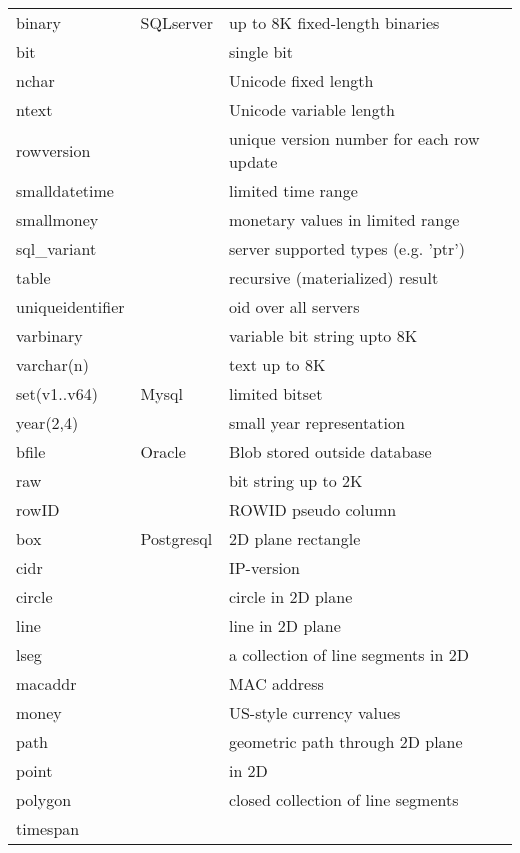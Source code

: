 \documentclass[10pt,twocolumn,fleqn]{article}
\begin{document}
\begin{tabular}{l |l |l}
binary & SQLserver & up to 8K fixed-length binaries\\
bit	&  & single bit\\
nchar	&  & Unicode fixed length\\
ntext	&  & Unicode variable length\\
rowversion&  & unique version number for each row update\\
smalldatetime&  & limited time range\\
smallmoney &  & monetary values in limited range\\
sql\_variant&  & server supported types (e.g. 'ptr')\\
table &  & recursive (materialized) result\\
uniqueidentifier&  & oid over all servers\\
varbinary&  & variable bit string upto 8K\\
varchar(n)&  & text up to 8K\\\hline

set(v1..v64)& Mysql & limited bitset\\
year(2,4) & & small year representation\\\hline

bfile & Oracle & Blob stored outside database\\
raw & & bit string up to 2K\\
rowID & & ROWID pseudo column\\\hline

box	& Postgresql & 2D plane rectangle\\
cidr	& & IP-version\\
circle	& & circle in 2D plane\\
line	& & line in 2D plane\\
lseg	& & a collection of line segments in 2D\\
macaddr & & MAC address\\
money	& & US-style currency values\\
path	& & geometric path through 2D plane\\
point	& & in 2D\\
polygon & & closed collection of line segments\\
timespan & & \\
\end{tabular}
\end{document}
